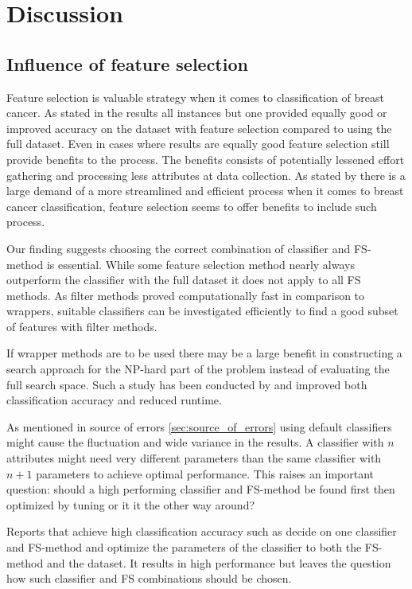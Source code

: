 \chapter{Discussion}

\section{Influence of feature selection}

Feature selection is valuable strategy when it comes to classification of breast cancer. As stated in the results all instances but one provided equally good or improved accuracy on the dataset with feature selection compared to using the full dataset. Even in cases where results are equally good feature selection still provide benefits to the process. The benefits consists of potentially lessened effort gathering and processing less attributes at data collection. As stated by \textcite{martei2018} there is a large demand of a more streamlined and efficient process when it comes to breast cancer classification, feature selection seems to offer benefits to include such process.

Our finding suggests choosing the correct combination of classifier and FS-method is essential. While some feature selection method nearly always outperform the classifier with the full dataset it does not apply to all FS methods. As filter methods proved computationally fast in comparison to wrappers, suitable classifiers can be investigated efficiently to find a good subset of features with filter methods.

If wrapper methods are to be used there may be a large benefit in constructing a search approach for the NP-hard part of the problem instead of evaluating the full search space. Such a study has been conducted by \textcite{panthong2015} and improved both classification accuracy and reduced runtime.

As mentioned in source of errors \ref{sec:source_of_errors} using default classifiers might cause the fluctuation and wide variance in the results. A classifier with $n$ attributes might need very different parameters than the same classifier with $n + 1$ parameters to achieve optimal performance. This raises an important question: should a high performing classifier and FS-method be found first then optimized by tuning or it it the other way around?

Reports that achieve high classification accuracy such as \parencite{akay2009} decide on one classifier and FS-method and optimize the parameters of the classifier to both the FS-method and the dataset. It results in high performance but leaves the question how such classifier and FS combinations should be chosen.

